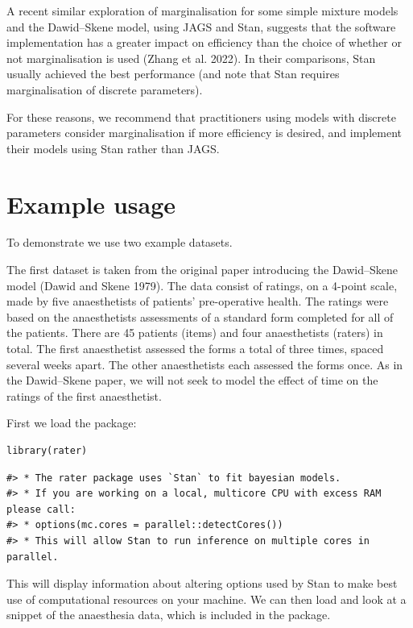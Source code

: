 A recent similar exploration of marginalisation for some simple mixture
models and the Dawid--Skene model, using JAGS and Stan, suggests that
the software implementation has a greater impact on efficiency than the
choice of whether or not marginalisation is used (Zhang et al. 2022). In their
comparisons, Stan usually achieved the best performance (and note that
Stan requires marginalisation of discrete parameters).

For these reasons, we recommend that practitioners using models with
discrete parameters consider marginalisation if more efficiency is
desired, and implement their models using Stan rather than JAGS.

\hypertarget{sec:usage}{%
\section{Example usage}\label{sec:usage}}

To demonstrate  we use two example datasets.

The first dataset is taken from the original paper introducing the Dawid--Skene
model (Dawid and Skene 1979). The data consist of ratings, on a 4-point scale, made
by five anaesthetists of patients' pre-operative health. The ratings were based
on the anaesthetists assessments of a standard form completed for all of the
patients. There are 45 patients (items) and four anaesthetists (raters) in
total. The first anaesthetist assessed the forms a total of three times, spaced
several weeks apart. The other anaesthetists each assessed the forms once. As
in the Dawid--Skene paper, we will not seek to model the effect of time on the
ratings of the first anaesthetist.

First we load the  package:

\begin{verbatim}
library(rater)
\end{verbatim}

\begin{verbatim}
#> * The rater package uses `Stan` to fit bayesian models.
#> * If you are working on a local, multicore CPU with excess RAM please call:
#> * options(mc.cores = parallel::detectCores())
#> * This will allow Stan to run inference on multiple cores in parallel.
\end{verbatim}

This will display information about altering options used by Stan to
make best use of computational resources on your machine. We can then load and
look at a snippet of the anaesthesia data, which is included in the package.

